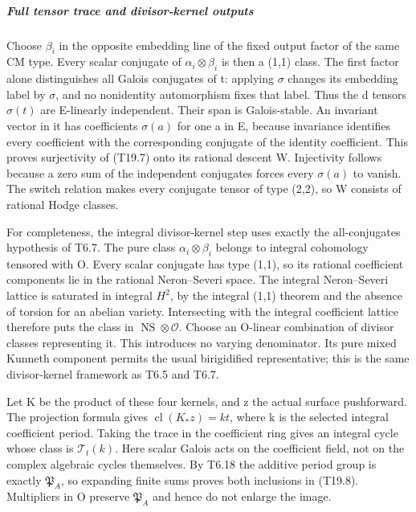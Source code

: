 \subparagraph{Full tensor trace and divisor-kernel outputs}\label{full-tensor-trace-and-divisor-kernel-outputs}

Choose \(\beta_i\) in the opposite embedding line of the fixed output factor of the same CM type. Every scalar conjugate of \(\alpha_i\otimes\beta_i\) is then a (1,1) class. The first factor alone distinguishes all Galois conjugates of t: applying \(\sigma\) changes its embedding label by \(\sigma\), and no nonidentity automorphism fixes that label. Thus the d tensors \(\sigma(t)\) are E-linearly independent. Their span is Galois-stable. An invariant vector in it has coefficients \(\sigma(a)\) for one a in E, because invariance identifies every coefficient with the corresponding conjugate of the identity coefficient. This proves surjectivity of (T19.7) onto its rational descent W. Injectivity follows because a zero sum of the independent conjugates forces every \(\sigma(a)\) to vanish. The switch relation makes every conjugate tensor of type (2,2), so W consists of rational Hodge classes.

For completeness, the integral divisor-kernel step uses exactly the all-conjugates hypothesis of T6.7. The pure class \(\alpha_i\otimes\beta_i\) belongs to integral cohomology tensored with O. Every scalar conjugate has type (1,1), so its rational coefficient components lie in the rational Neron--Severi space. The integral Neron--Severi lattice is saturated in integral \(H^2\), by the integral (1,1) theorem and the absence of torsion for an abelian variety. Intersecting with the integral coefficient lattice therefore puts the class in \(\operatorname{NS}\otimes\mathcal O\). Choose an O-linear combination of divisor classes representing it. This introduces no varying denominator. Its pure mixed Kunneth component permits the usual birigidified representative; this is the same divisor-kernel framework as T6.5 and T6.7.

Let K be the product of these four kernels, and z the actual surface pushforward. The projection formula gives \(\operatorname{cl}(K_*z)=kt\), where k is the selected integral coefficient period. Taking the trace in the coefficient ring gives an integral cycle whose class is \(\mathcal T_t(k)\). Here scalar Galois acts on the coefficient field, not on the complex algebraic cycles themselves. By T6.18 the additive period group is exactly \(\mathfrak P_A\), so expanding finite sums proves both inclusions in (T19.8). Multipliers in O preserve \(\mathfrak P_A\) and hence do not enlarge the image.

